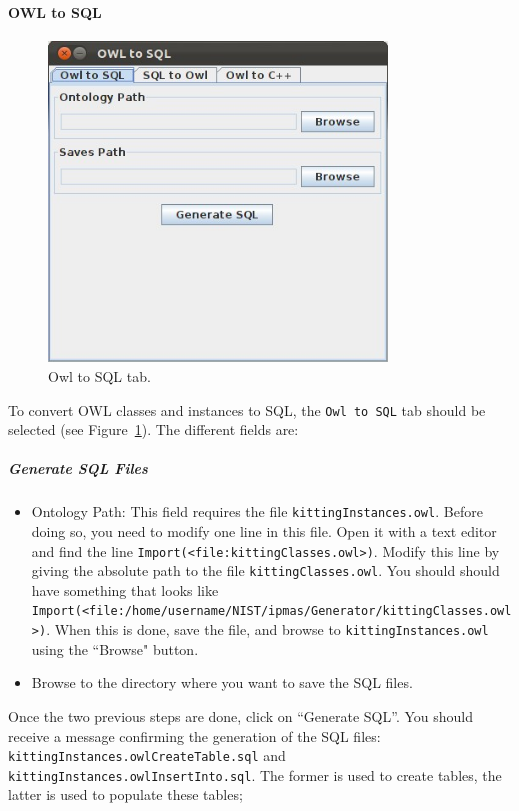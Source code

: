 \paragraph{OWL to SQL}
\begin{figure}[h!t!]
\centering
\includegraphics[width=9cm]{Figure/OWLtoSQL001.jpeg}
\caption{Owl to SQL tab.}
\label{fig:owl2sql}
\end{figure}
To convert OWL classes and instances to SQL, the \texttt{Owl to SQL} tab should be selected (see Figure~\ref{fig:owl2sql}). The different fields are:

\subparagraph{Generate SQL Files}
\begin{itemize}
 \item Ontology Path: This field requires the file \texttt{kittingInstances.owl}. Before doing so, you need to modify one line in this file. Open it with a text editor and find the line \texttt{Import(<file:kittingClasses.owl>)}. Modify
this line by giving the absolute path to the file \texttt{kittingClasses.owl}. You should should have something that looks like \texttt{Import(<file:/home/username/NIST/ipmas/Generator/kittingClasses.owl>)}. When this is done, save the file, and browse to  \texttt{kittingInstances.owl} using the ``Browse" button.
 \item Browse to the directory where you want to save the SQL files.
\end{itemize}

Once the two previous steps are done, click on ``Generate SQL''. You should receive a message confirming the generation of the SQL files: \texttt{kittingInstances.owlCreateTable.sql} and \texttt{kittingInstances.owlInsertInto.sql}. The former is used to create tables, the latter is used to populate these tables;

